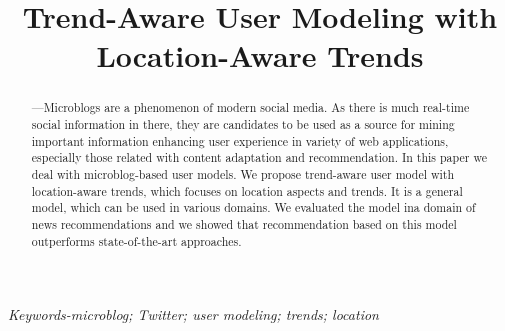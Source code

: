 \documentclass[a4, conference]{IEEEtran}
\begin{document}
\title{\LARGE{{Trend-Aware User Modeling with Location-Aware Trends}}}

\author{
}


\maketitle


\begin{abstract}
—Microblogs   are   a   phenomenon   of   modern   social 
media.  As  there  is  much  real-time  social  information  in  there, they   are   candidates   to   be   used   as   a   source   for   mining important information enhancing user experience in variety of web    applications,    especially    those    related    with    content adaptation  and  recommendation.  In  this  paper  we  deal  with microblog-based  user  models.  We  propose trend-aware  user model  with  location-aware  trends,  which  focuses  on location aspects and trends. It is a general model, which can be used in various domains. We evaluated the model ina domain of news recommendations  and  we  showed  that  recommendation  based on this model outperforms state-of-the-art approaches. 
\\
 
\end{abstract}

\IEEEpeerreviewmaketitle

\textit{Keywords-microblog;    Twitter;    user    modeling;    trends; location}
\end{document}

